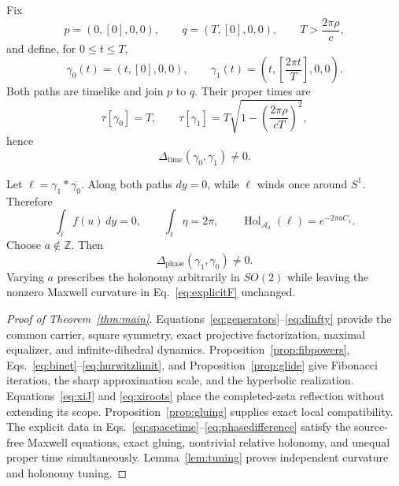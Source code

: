 \documentclass[10pt,oneside]{article}
\theoremstyle{plaincompact}
\theoremstyle{definitioncompact}
\newcommand{\Hol}{\operatorname{Hol}}
\newcommand{\Ad}{\mathcal A}
\begin{document}
Fix
\begin{equation}\label{eq:endpoints}
p=(0,[0],0,0),\qquad q=(T,[0],0,0),
\qquad T>\frac{2\pi\rho}{c},
\end{equation}
and define, for $0\le t\le T$,
\begin{equation}\label{eq:paths}
\gamma_0(t)=(t,[0],0,0),\qquad
\gamma_1(t)=\left(t,\left[\frac{2\pi t}{T}\right],0,0\right).
\end{equation}
Both paths are timelike and join $p$ to $q$.  Their proper times are
\begin{equation}\label{eq:times}
\tau[\gamma_0]=T,
\qquad
\tau[\gamma_1]=T\sqrt{1-\left(\frac{2\pi\rho}{cT}\right)^2},
\end{equation}
hence
\begin{equation}\label{eq:timedifference}
\Delta_{\mathrm{time}}(\gamma_0,\gamma_1)\ne0.
\end{equation}

Let $\ell=\gamma_1*\overline{\gamma_0}$.  Along both paths $dy=0$, while
$\ell$ winds once around $S^1$.  Therefore
\begin{equation}\label{eq:loopholonomy}
\int_\ell f(u)\,dy=0,\qquad
\int_\ell\eta=2\pi,\qquad
\Hol_{\Ad_a}(\ell)=e^{-2\pi aC_1}.
\end{equation}
Choose $a\notin\mathbb Z$.  Then
\begin{equation}\label{eq:phasedifference}
\Delta_{\mathrm{phase}}(\gamma_1,\gamma_0)\ne0.
\end{equation}
Varying $a$ prescribes the holonomy arbitrarily in $SO(2)$ while leaving the
nonzero Maxwell curvature in Eq.~\eqref{eq:explicitF} unchanged.

\begin{proof}[Proof of Theorem~\ref{thm:main}]
Equations~\eqref{eq:generators}--\eqref{eq:dinfty} provide the common carrier,
square symmetry, exact projective factorization, maximal equalizer, and
infinite-dihedral dynamics.  Proposition~\ref{prop:fibpowers},
Eqs.~\eqref{eq:binet}--\eqref{eq:hurwitzlimit}, and
Proposition~\ref{prop:glide} give Fibonacci iteration, the sharp approximation
scale, and the hyperbolic realization.  Equations~\eqref{eq:xiJ} and
\eqref{eq:xiroots} place the completed-zeta reflection without extending its
scope.  Proposition~\ref{prop:gluing} supplies exact local compatibility.
The explicit data in Eqs.~\eqref{eq:spacetime}--\eqref{eq:phasedifference}
satisfy the source-free Maxwell equations, exact gluing, nontrivial relative
holonomy, and unequal proper time simultaneously.  Lemma~\ref{lem:tuning}
proves independent curvature and holonomy tuning.
\end{proof}
\end{document}
